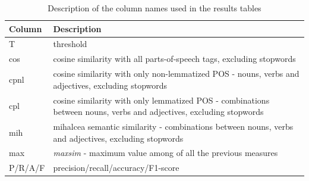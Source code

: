 \begin{table}[h]
\begin{center}
    \begin{tabular}{ | p{} | p{} |}
    \hline
    \textbf{Column} & \textbf{Description} \\ \hline
    T & threshold  \\ \hline
    cos & cosine similarity with all parts-of-speech tags, excluding stopwords \\ \hline
    cpnl & cosine similarity with only non-lemmatized POS - nouns, verbs and adjectives, excluding stopwords \\ \hline
    cpl & cosine similarity with only lemmatized POS - combinations between nouns, verbs and adjectives, excluding stopwords \\ \hline
    mih & mihalcea semantic similarity - combinations between nouns, verbs and adjectives, excluding stopwords\\ \hline
    max & \textit{maxsim} - maximum value among of all the previous measures \\ \hline
    P/R/A/F & precision/recall/accuracy/F1-score \\ \hline
    \end{tabular}
\caption{Description of the column names used in the results tables}
\label{tab:legend}
\end{center}
\end{table}
